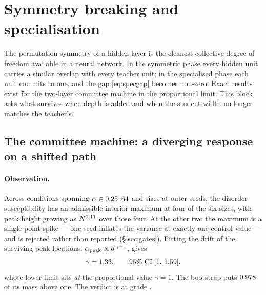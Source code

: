 \section{Symmetry breaking and specialisation}
\label{sec:symmetry}

The permutation symmetry of a hidden layer is the cleanest collective degree of
freedom available in a neural network. In the symmetric phase every hidden unit
carries a similar overlap with every teacher unit; in the specialised phase each
unit commits to one, and the gap \eqref{eq:specgap} becomes non-zero. Exact
results exist for the two-layer committee machine in the proportional limit.
This block asks what survives when depth is added and when the student width no
longer matches the teacher's.

\subsection{The committee machine: a diverging response on a shifted path}


\paragraph{Observation.}
Across \AtlasSpecializationConditions{} conditions spanning
$\alpha\in0.25\text{--}64{}$ and
\AtlasSpecializationSizes{} sizes at \AtlasSpecializationSeeds{} outer seeds,
the disorder susceptibility has an admissible interior maximum at four of the
six sizes, with peak height growing as
$N^{1.11{}}$ over those four. At the other two the
maximum is a single-point spike --- one seed inflates the variance at exactly one
control value --- and is rejected rather than reported (\S\ref{sec:gates}).
Fitting the drift of the surviving peak locations,
$\alpha_{\rm peak}\propto d^{\,\gamma-1}$, gives
\begin{equation}
  \gamma=1.33{},\qquad
  95\%\ \text{CI}\;[1,\,1.59]{},
  \label{eq:gamma-spec}
\end{equation}
whose lower limit sits \emph{at} the proportional value $\gamma=1$. The
bootstrap puts $0.978{}$ of its mass above one. The
verdict is \emph{\AtlasSpecializationVerdict{}} at grade
\AtlasSpecializationGrade{}.

